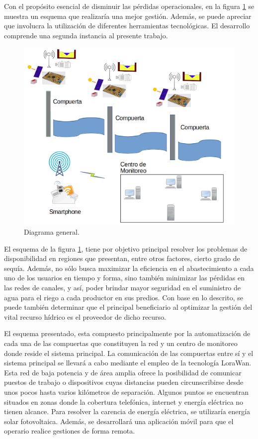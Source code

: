 Con el propósito esencial de disminuir las pérdidas operacionales, en la figura \ref{fig:DiagramaEnBloqueGeneralV1} se muestra un esquema que realizaría una mejor gestión.
Además, se puede apreciar que involucra la utilización de diferentes herramientas tecnológicas. El desarrollo comprende una segunda instancia al presente trabajo. 
    
\begin{figure}[h]
\centering

\includegraphics[width=1\textwidth]{./Figures/DiagramaEnBloqueGeneralV2.png}
\caption{Diagrama general.}
\label{fig:DiagramaEnBloqueGeneralV1}
\end{figure}

El esquema de la figura \ref{fig:DiagramaEnBloqueGeneralV1}, tiene por objetivo principal resolver los problemas de disponibilidad en regiones que presentan, entre otros factores, cierto grado de sequía. Además, no sólo busca maximizar la eficiencia en el abastecimiento a cada uno de los usuarios en tiempo y forma, sino también minimizar las pérdidas en las redes de canales, y así, poder brindar mayor seguridad en el suministro de agua para el riego a cada productor en sus predios.
Con base en lo descrito, se puede también determinar que el principal beneficiario al optimizar la gestión del vital recurso hídrico es el proveedor de dicho recurso.

El esquema presentado, esta compuesto principalmente por la automatización de cada una de las compuertas que constituyen la red y un centro de monitoreo donde reside el sistema principal. La comunicación de las compuertas entre sí y el sistema principal se llevará a cabo mediante el empleo de la tecnología LoraWan. Esta red de baja potencia y de área amplia ofrece la posibilidad de comunicar puestos de trabajo o dispositivos cuyas distancias pueden circunscribirse desde unos pocos hasta varios kilómetros de separación. Algunos puntos se encuentran situados en zonas donde la cobertura telefónica, internet y energía eléctrica no tienen alcance. Para resolver la carencia de energía eléctrica, se utilizaría energía solar fotovoltaica. Además, se desarrollará una aplicación móvil para que el operario realice gestiones de forma remota.

